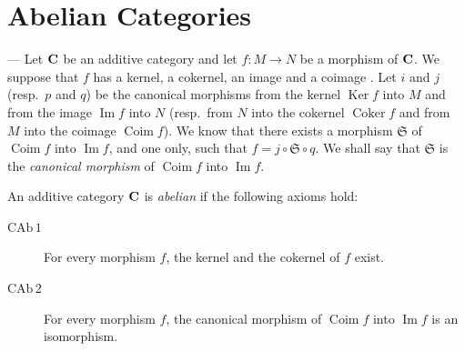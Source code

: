 %

\section{Abelian Categories}
--- Let $\mathbf{C}$ be an additive category and let $f\colon M\to N$ be a morphism
of $\mathbf{C}$. We suppose that $f$ has a kernel, a cokernel, an image and a
coimage \cite{grothendieck-1}. Let $i$ and $j$ (resp.\ $p$ and $q$) be the canonical morphisms
from the kernel $\operatorname{Ker} f$ into $M$ and from the image
$\operatorname{Im} f$ into $N$ (resp.\ from $N$ into the cokernel
$\operatorname{Coker} f$ and from $M$ into the coimage $\operatorname{Coim}
f$). We know that there exists a morphism $\mathfrak{S}$ of $\operatorname{Coim}
f$ into $\operatorname{Im} f$, and one only, such that
$f = j\circ\mathfrak{S}\circ q$. We shall say that $\mathfrak{S}$ is the
\emph{canonical morphism} of $\operatorname{Coim} f$ into $\operatorname{Im} f$.

An additive category $\mathbf{C}$ is \emph{abelian} if the following axioms hold:

\begin{description}
\item[$\mathrm{CAb}\,1$] For every morphism $f$, the kernel and the cokernel
      of $f$ exist.

\item[$\mathrm{CAb}\,2$] For every morphism $f$, the canonical morphism of
      $\operatorname{Coim} f$ into $\operatorname{Im} f$ is an isomorphism.
\end{description}

